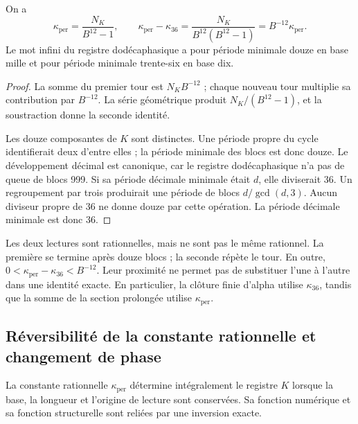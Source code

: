 \begin{proposition}
\label{x_reciprocidad:prop:k-periodo}
On a
\begin{equation}
 \kappa_{\mathrm{per}}=\frac{N_K}{B^{12}-1},\qquad
 \kappa_{\mathrm{per}}-\kappa_{36}
 =\frac{N_K}{B^{12}(B^{12}-1)}
 =B^{-12}\kappa_{\mathrm{per}}.
 \label{x_reciprocidad:eq:k-diferencia-kappas}
\end{equation}
Le mot infini du registre dodécaphasique a pour période minimale douze en base mille et pour période minimale trente-six en base dix.
\end{proposition}

\begin{proof}
La somme du premier tour est \(N_KB^{-12}\) ; chaque nouveau tour
multiplie sa contribution par \(B^{-12}\). La série géométrique produit
\(N_K/(B^{12}-1)\), et la soustraction donne la seconde identité.

Les douze composantes de \(K\) sont distinctes. Une période propre du cycle
identifierait deux d'entre elles ; la période minimale des blocs est donc
douze. Le développement décimal est canonique, car le registre dodécaphasique n'a pas de queue
de blocs 999. Si sa période décimale minimale était \(d\), elle diviserait
36. Un regroupement par trois produirait une période de blocs
\(d/\gcd(d,3)\). Aucun diviseur propre de 36 ne donne douze par cette
opération. La période décimale minimale est donc 36.
\end{proof}

Les deux lectures sont rationnelles, mais ne sont pas le même rationnel. La première se termine après douze blocs ; la seconde répète le tour. En outre, \(0<\kappa_{\mathrm{per}}-\kappa_{36}<B^{-12}\). Leur proximité ne permet pas de substituer l'une à l'autre dans une identité exacte. En particulier, la clôture finie d'alpha utilise \(\kappa_{36}\), tandis que la somme de la section prolongée utilise \(\kappa_{\mathrm{per}}\).


\subsection{Réversibilité de la constante rationnelle et changement de phase}

La constante rationnelle \(\kappa_{\mathrm{per}}\) détermine intégralement
le registre \(K\) lorsque la base, la longueur et l'origine
de lecture sont conservées. Sa fonction numérique et sa fonction structurelle sont reliées
par une inversion exacte.

